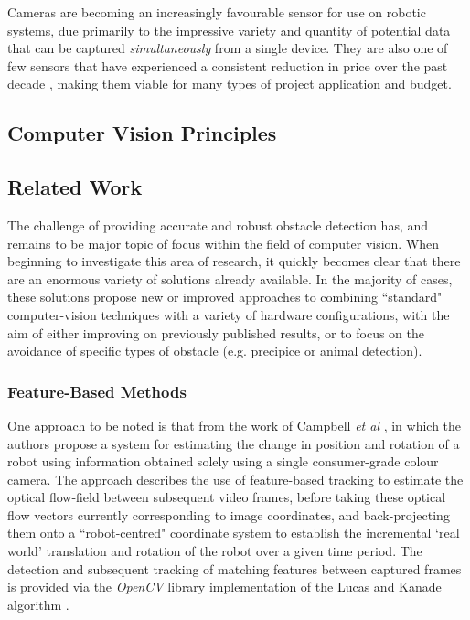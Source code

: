 Cameras are becoming an increasingly favourable sensor for use on robotic systems, due primarily to the impressive variety and quantity of potential data that can be captured \textit{simultaneously} from a single device. They are also one of few sensors that have experienced a consistent reduction in price over the past decade \cite{campbell}, making them viable for many types of project application and budget. 

\subsection{Computer Vision Principles}

\subsection{Related Work}
\label{related-work}

The challenge of providing accurate and robust obstacle detection has, and remains to be major topic of focus within the field of computer vision. When beginning to investigate this area of research, it quickly becomes clear that there are an enormous variety of solutions already available. In the majority of cases, these solutions propose new or improved approaches to combining ``standard" computer-vision techniques with a variety of hardware configurations, with the aim of either improving on previously published results, or to focus on the avoidance of specific types of obstacle (e.g. precipice or animal detection). 


\subsubsection{Feature-Based Methods}

One approach to be noted is that from the work of Campbell \textit{et al} \cite{campbell}, in which the authors propose a system for estimating the change in position and rotation of a robot using information obtained solely using a single consumer-grade colour camera. The approach describes the use of feature-based tracking to estimate the optical flow-field between subsequent video frames, before taking these optical flow vectors currently corresponding to image coordinates, and back-projecting them onto a ``robot-centred" coordinate system to establish the incremental `real world' translation and rotation of the robot over a given time period. The detection and subsequent tracking of matching features between captured frames is provided via the \textit{OpenCV} library implementation of the Lucas and Kanade algorithm \cite{opencv-lucas-kanade-features}. 

